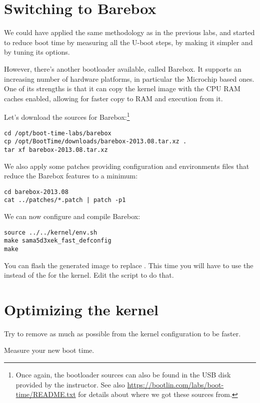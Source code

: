 
\section{Switching to Barebox}

We could have applied the same methodology as in the previous labs, and
started to reduce boot time by measuring all the U-boot steps, by making
it simpler and by tuning its options.

However, there's another bootloader available, called Barebox. It
supports an increasing number of hardware platforms, in particular the
Microchip based ones. One of its strengths is that it can copy the kernel
image with the CPU RAM caches enabled, allowing for faster copy to RAM
and execution from it.

Let's download the sources for Barebox:\footnote{Once again, the
bootloader sources can also be found in the USB disk provided by
the instructor. See also \url{https://bootlin.com/labs/boot-time/README.txt}
for details about where we got these sources from.}

\begin{verbatim}
cd /opt/boot-time-labs/barebox
cp /opt/BootTime/downloads/barebox-2013.08.tar.xz .
tar xf barebox-2013.08.tar.xz
\end{verbatim}

We also apply some patches providing configuration and environments files
that reduce the Barebox features to a minimum:

\begin{verbatim}
cd barebox-2013.08
cat ../patches/*.patch | patch -p1
\end{verbatim}

We can now configure and compile Barebox:

\begin{verbatim}
source ../../kernel/env.sh
make sama5d3xek_fast_defconfig
make
\end{verbatim}

You can flash the generated image  to
replace . This time you will have to use the
 instead of the  for the kernel. Edit the
 script to do that.

\section{Optimizing the kernel}

Try to remove as much as possible from the kernel configuration to be
faster.

Measure your new boot time.
